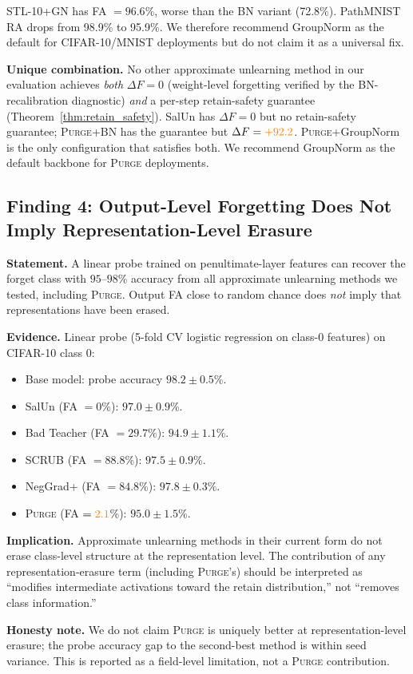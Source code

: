 \documentclass{article}
\newcommand{\ours}{\textsc{Purge}}
\newcommand{\new}[1]{{\color{orange}#1}}
\begin{document}
{{STL-10+GN has FA $= 96.6$\%, worse than the BN variant (72.8\%). PathMNIST RA drops from 98.9\% to 95.9\%. We therefore recommend GroupNorm as the default for CIFAR-10/MNIST deployments but do not claim it as a universal fix.
}

\textbf{Unique combination.} No other approximate unlearning method in our evaluation achieves \emph{both} $\Delta F = 0$ (weight-level forgetting verified by the BN-recalibration diagnostic) \emph{and} a per-step retain-safety guarantee (Theorem~\ref{thm:retain_safety}). SalUn has $\Delta F = 0$ but no retain-safety guarantee; \ours{}+BN has the guarantee but $\Delta F = \new{+92.2}$. \ours{}+GroupNorm is the only configuration that satisfies both. We recommend GroupNorm as the default backbone for \ours{} deployments.

\subsection{Finding 4: Output-Level Forgetting Does Not Imply Representation-Level Erasure}
\label{find:probe}

\textbf{Statement.} A linear probe trained on penultimate-layer features can recover the forget class with $95$--$98$\% accuracy from all approximate unlearning methods we tested, including \ours{}. Output FA close to random chance does \emph{not} imply that representations have been erased.

\textbf{Evidence.} Linear probe (5-fold CV logistic regression on class-0 features) on CIFAR-10 class 0:
\begin{itemize}[nosep,leftmargin=*]
\item Base model: probe accuracy $98.2 \pm 0.5$\%.
\item SalUn (FA $= 0$\%): $97.0 \pm 0.9$\%.
\item Bad Teacher (FA $= 29.7$\%): $94.9 \pm 1.1$\%.
\item SCRUB (FA $= 88.8$\%): $97.5 \pm 0.9$\%.
\item NegGrad+ (FA $= 84.8$\%): $97.8 \pm 0.3$\%.
\item \ours{} (FA $= \new{2.1}$\%): $95.0 \pm 1.5$\%.
\end{itemize}

\textbf{Implication.} Approximate unlearning methods in their current form do not erase class-level structure at the representation level. The contribution of any representation-erasure term (including \ours{}'s) should be interpreted as ``modifies intermediate activations toward the retain distribution,'' not ``removes class information.''

\textbf{Honesty note.} We do not claim \ours{} is uniquely better at representation-level erasure; the probe accuracy gap to the second-best method is within seed variance. This is reported as a field-level limitation, not a \ours{} contribution.
}
\end{document}
